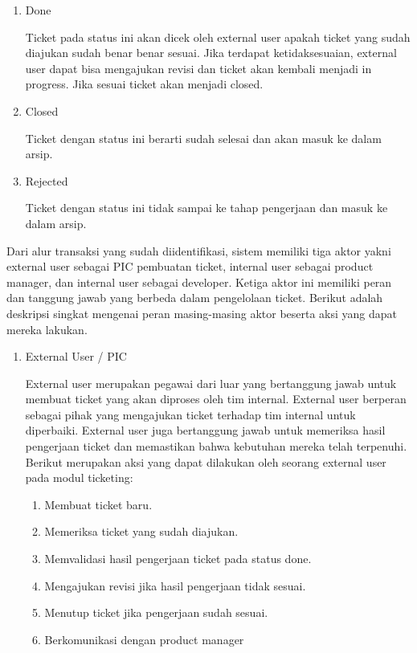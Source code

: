 \documentclass[12pt]{article}
\begin{document}
\begin{enumerate}[label=\textbf{4.\arabic*.}]
\begin{enumerate}[label=\textbf{4.1.\arabic*.}]
\begin{enumerate}[label=\arabic*.]
            \item Done
            
            Ticket pada status ini akan dicek oleh external user apakah ticket yang sudah diajukan sudah benar benar sesuai. Jika terdapat ketidaksesuaian, external user dapat bisa mengajukan revisi dan ticket akan kembali menjadi in progress. Jika sesuai ticket akan menjadi closed.
            
            \item Closed
            
            Ticket dengan status ini berarti sudah selesai dan akan masuk ke dalam arsip.
            
            \item Rejected
            
            Ticket dengan status ini tidak sampai ke tahap pengerjaan dan masuk ke dalam arsip.
        \end{enumerate}

        Dari alur transaksi yang sudah diidentifikasi, sistem memiliki tiga aktor yakni external user sebagai PIC pembuatan ticket, internal user sebagai product manager, dan internal user sebagai developer. Ketiga aktor ini memiliki peran dan tanggung jawab yang berbeda dalam pengelolaan ticket. Berikut adalah deskripsi singkat mengenai peran masing-masing aktor beserta aksi yang dapat mereka lakukan.

        \begin{enumerate}[label=\arabic*.]
            \item External User / PIC
            
            External user merupakan pegawai dari luar yang bertanggung jawab untuk membuat ticket yang akan diproses oleh tim internal. External user berperan sebagai pihak yang mengajukan ticket terhadap tim internal untuk diperbaiki. External user juga bertanggung jawab untuk memeriksa hasil pengerjaan ticket dan memastikan bahwa kebutuhan mereka telah terpenuhi. Berikut merupakan aksi yang dapat dilakukan oleh seorang external user pada modul ticketing:
            \begin{enumerate}
                \item Membuat ticket baru.
                \item Memeriksa ticket yang sudah diajukan.
                \item Memvalidasi hasil pengerjaan ticket pada status done.
                \item Mengajukan revisi jika hasil pengerjaan tidak sesuai.
                \item Menutup ticket jika pengerjaan sudah sesuai.
                \item Berkomunikasi dengan product manager
            \end{enumerate}


\end{enumerate}
\end{enumerate}
\end{enumerate}
\end{document}
